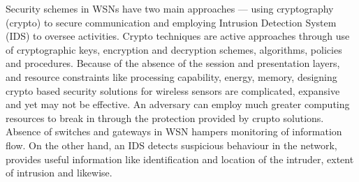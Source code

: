 \documentclass[conference,final]{IEEEtran}
\begin{document}
Security schemes in WSNs have two main approaches --- using cryptography (crypto) to secure communication and  employing Intrusion Detection System (IDS) to oversee activities.
Crypto techniques are active approaches through use of cryptographic keys, encryption and decryption schemes, algorithms, policies and procedures.
Because  of the absence of the session and presentation layers, and resource constraints like processing capability, energy, memory, designing crypto based security solutions for wireless sensors are complicated, expansive and yet may not be effective.
An adversary can employ much greater computing resources to break in through the protection provided by crupto solutions.
Absence of switches and gateways in WSN hampers monitoring of information flow.
On the other hand, an IDS detects suspicious behaviour in the network, provides useful information like identification and location of the intruder, extent of intrusion and likewise.
\end{document}
